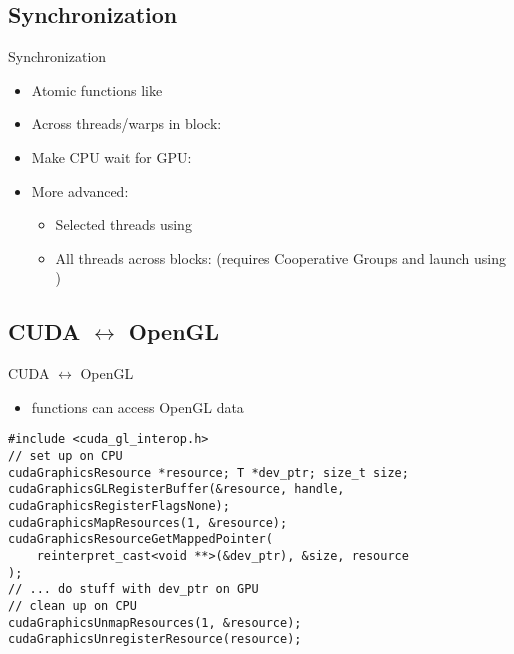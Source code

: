 \subsection{Synchronization}\label{subsec:synchronization}
\begin{frame}[fragile]{Synchronization}
    \center
    \begin{itemize}
        \item Atomic functions like 
        \item Across threads/warps in block: 
        \item Make CPU wait for GPU: 
        \item More advanced:
        \begin{itemize}
            \item Selected threads using 
            \item All threads across blocks:  (requires Cooperative Groups and launch using )
        \end{itemize}
    \end{itemize}
\end{frame}

\subsection{CUDA $\leftrightarrow$ OpenGL}\label{subsec:cuda-opengl}
\begin{frame}[fragile]{CUDA $\leftrightarrow$ OpenGL}
    \center
    \begin{itemize}
        \item<1->  functions can access OpenGL data
    \end{itemize}
    \begin{verbatim}
#include <cuda_gl_interop.h>
// set up on CPU
cudaGraphicsResource *resource; T *dev_ptr; size_t size;
cudaGraphicsGLRegisterBuffer(&resource, handle, cudaGraphicsRegisterFlagsNone);
cudaGraphicsMapResources(1, &resource);
cudaGraphicsResourceGetMappedPointer(
    reinterpret_cast<void **>(&dev_ptr), &size, resource
);
// ... do stuff with dev_ptr on GPU
// clean up on CPU
cudaGraphicsUnmapResources(1, &resource);
cudaGraphicsUnregisterResource(resource);
    \end{verbatim}
\end{frame}